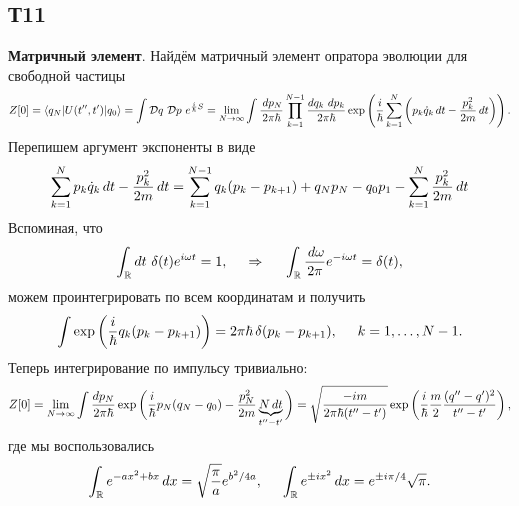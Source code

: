\subsection*{Т11}

\textbf{Матричный элемент}.
Найдём матричный элемент опратора эволюции для свободной частицы
\begin{equation*}
    Z[0] = \bk{q_N}[U(t'',t')]{q_0} = \int \mathcal D q\ \mathcal D p\
    e^{\frac{i}{\hbar}S} = \lim_{N\to \infty}
    \int \frac{\d p_N}{2\pi\hbar} \prod_{k=1}^{N-1}
    \frac{d q_k\ d p_k}{2 \pi \hbar} \exp\left(
        \frac{i}{\hbar} \sum_{k=1}^{N} \left(
            p_k \dot{q}_k \d t - \frac{p_k^2}{2m}\d t
        \right)
    \right).
\end{equation*}
Перепишем аргумент экспоненты в виде
\begin{equation*}
    \sum_{k=1}^{N} p_k \dot{q}_k \, d t - \frac{p_k^2}{2m}\, d t =
    \sum_{k=1}^{N-1} q_k (p_k-p_{k+1}) + q_N p_N - q_0 p_1 - \sum_{k=1}^{N} \frac{p_k^2}{2m}\, d t
\end{equation*}
Вспоминая, что
\begin{equation*}
    \int_{\mathbb{R}} dt\ \delta(t) e^{i \omega t} = 1,
    \hspace{0.5cm} \Rightarrow \hspace{0.5cm}
    \int_{\mathbb{R}} \frac{\, d \omega}{2\pi}e^{-i \omega t} = \delta(t),
\end{equation*}
можем проинтегрировать по всем координатам и получить
\begin{equation*}
    \int \exp\left(\frac{i}{\hbar} q_k (p_k - p_{k+1})\right) = 2 \pi \hbar \, \delta(p_k - p_{k+1}),
    \hspace{5 mm} 
    k = 1,\ldots, N-1.
\end{equation*}
Теперь интегрирование по импульсу тривиально:
\begin{equation*}
    Z[0] = \lim_{N \to \infty} \int \frac{d p_N}{2 \pi \hbar} \exp\bigg(
        \frac{i}{\hbar} p_N (q_N-q_0) - \frac{p_N^2}{2m} \underbrace{ N \, d t}_{t''-t'}
    \bigg) = \sqrt{\frac{-i m}{2 \pi \hbar (t'' - t')}} \exp\left(
        \frac{i}{\hbar} \frac{m}{2} \frac{(q'' - q')^2}{t''-t'}
    \right),
\end{equation*}
где мы воспользовались 
\begin{equation*}
    \int_{\mathbb{R}} e^{-a x^2 + b x} \, d x = \sqrt{\frac{\pi}{a}} e^{b^2/4a},
    \hspace{5 mm} 
    \int_{\mathbb{R}} e^{\pm i x^2} \, d x = e^{\pm i \pi/4} \sqrt{\pi}.
\end{equation*}


